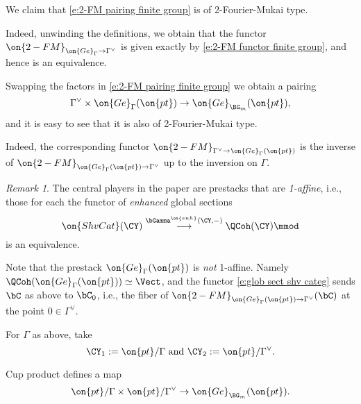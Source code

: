 \documentclass[9pt]{amsart}
\theoremstyle{remark}
\newtheorem{rem}[subsubsection]{Remark}
\theoremstyle{definition}
\theoremstyle{remark}
\numberwithin{equation}{section}
\begin{document}
We claim that \eqref{e:2-FM pairing finite group} is of 2-Fourier-Mukai type. 

\medskip

Indeed, unwinding the definitions, we obtain that the functor $\on{2-FM}_{\on{Ge}_{\Gamma}\to \Gamma^\vee}$ 
is given exactly by \eqref{e:2-FM functor finite group}, and hence is an equivalence. 

\sssec{} \label{sss:Ge finite rev}

Swapping the factors in \eqref{e:2-FM pairing finite group} we obtain a pairing
\begin{equation} \label{e:2-FM pairing finite group reverse}
\Gamma^\vee\times \on{Ge}_{\Gamma}(\on{pt})\to \on{Ge}_{\BG_m}(\on{pt}),
\end{equation}
and it is easy to see that it is also of 2-Fourier-Mukai type. 

\medskip

Indeed, the corresponding functor $\on{2-FM}_{\Gamma^\vee\to \on{Ge}_{\Gamma}(\on{pt})}$ is
the inverse of $\on{2-FM}_{\on{Ge}_{\Gamma}(\on{pt})\to \Gamma^\vee}$ up to the inversion on $\Gamma$. 

\begin{rem}\label{r:not 1 aff}
The central players in the paper \cite{Ga3} are prestacks that are \emph{1-affine}, 
i.e., those for each the functor
of \emph{enhanced} global sections
\begin{equation} \label{e:glob sect shv categ}
\on{ShvCat}(\CY)\overset{\bGamma^{\on{enh}}(\CY,-)}\longrightarrow \QCoh(\CY)\mmod
\end{equation} 
is an equivalence.

\medskip

Note that the prestack $\on{Ge}_{\Gamma}(\on{pt})$ is \emph{not} 1-affine. Namely 
$\QCoh(\on{Ge}_{\Gamma}(\on{pt}))\simeq \Vect$, and the functor \eqref{e:glob sect shv categ} sends
$\bC$ as above to $\bC_0$, i.e., the fiber of $\on{2-FM}_{\on{Ge}_{\Gamma}(\on{pt})\to \Gamma^\vee}(\bC)$
at the point $0\in \Gamma^\vee$. 

\end{rem}

 \label{sss:tors finite}

For $\Gamma$ as above, take 
$$\CY_1:=\on{pt}/\Gamma \text{ and } \CY_2:=\on{pt}/\Gamma^\vee.$$

Cup product defines a map
\begin{equation} \label{e:2-FM pairing finite group sym}
\on{pt}/\Gamma \times \on{pt}/\Gamma^\vee \to \on{Ge}_{\BG_m}(\on{pt}).
\end{equation}
\end{document}
